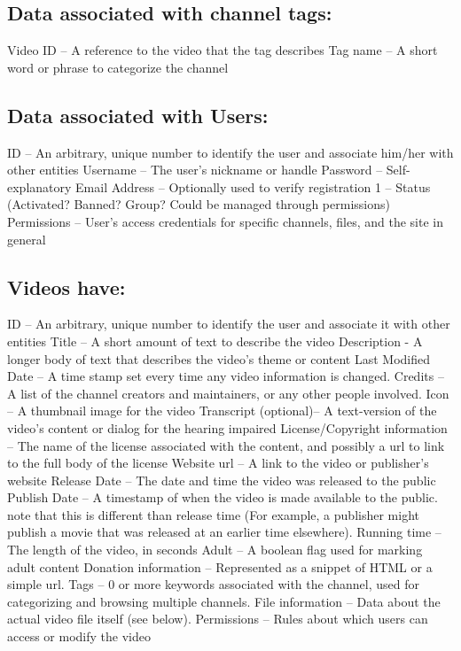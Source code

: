 \documentclass[a4paper,12pt]{report}
\begin{document}
\subsection{Data associated with channel tags:}
	Video ID – A reference to the video that the tag describes
	Tag name – A short word or phrase to categorize the channel

\subsection{Data associated with Users:}
	ID – An arbitrary, unique number to identify the user and associate him/her with 		other entities
	Username – The user's nickname or handle
	Password – Self-explanatory
	Email Address – Optionally used to verify registration
	1 – Status (Activated? Banned? Group? Could be managed through permissions)
	Permissions – User's access credentials for specific channels, files, and the site in 	general

\subsection{Videos have:}
	ID – An arbitrary, unique number to identify the user and associate it with other 		entities 
	Title – A short amount of text to describe the video
Description - A longer body of text that describes the video's theme or content
	Last Modified Date – A time stamp set every time any video information is 		changed.
	Credits – A list of the channel creators and maintainers, or any other people 		involved. 
	Icon – A thumbnail image for the video
	Transcript (optional)– A text-version of the video's content or dialog for the 		hearing impaired
	License/Copyright information – The name of the license associated with the 	content, and possibly a url to link to the full body of the license
	Website url – A link to the video  or publisher's website
	Release Date – The date and time the video was released to the public
Publish Date – A timestamp of when the video is made available to the public. 		note that this is different than release time (For example, a publisher might 		publish a movie that was released at an earlier time elsewhere).
	Running time – The length of the video, in seconds
	Adult – A boolean flag used for marking adult content
	Donation information – Represented as a snippet of HTML or a simple url.
Tags – 0 or more keywords associated with the channel, used for categorizing and 	browsing multiple channels.
File information – Data about the actual video file itself (see below).
	Permissions – Rules about which users can access or modify the video
\end{document}
